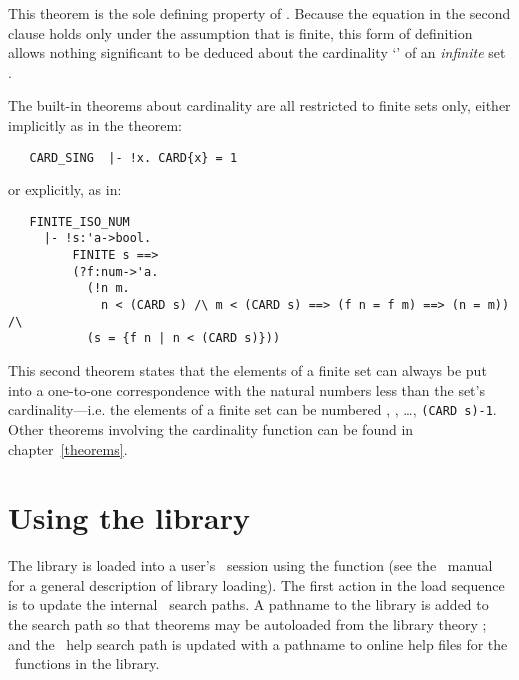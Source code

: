 \noindent This theorem is the sole defining property of .  Because the
equation in the second clause holds only under the assumption that  is
finite, this form of definition allows nothing significant to be deduced about
the cardinality `' of an {\it infinite\/} set .

The built-in theorems about cardinality are all restricted to finite sets only,
either implicitly as in the theorem:

\begin{hol}
\begin{verbatim}
   CARD_SING  |- !x. CARD{x} = 1
\end{verbatim}\end{hol}

\noindent or explicitly, as in:

\begin{hol}
\begin{verbatim}
   FINITE_ISO_NUM
     |- !s:'a->bool.
         FINITE s ==>
         (?f:num->'a.
           (!n m.
             n < (CARD s) /\ m < (CARD s) ==> (f n = f m) ==> (n = m)) /\
           (s = {f n | n < (CARD s)}))
\end{verbatim}\end{hol}

\noindent This second theorem states that the elements of a finite set can
always be put into a one-to-one correspondence with the natural numbers less
than the set's cardinality---i.e. the elements of a finite set \ml{s} can be
numbered \ml{0}, \ml{1}, \dots, {\small\verb!(CARD s)-1!}.  Other theorems
involving the cardinality function \ml{CARD} can be found in
chapter~\ref{theorems}.

\section{Using the library}\label{using}

The  library is loaded into a user's \HOL\ session using the
function \ml{load\_library} (see the \HOL\ manual for a general description of
library loading).  The first action in the load sequence is to update the
internal \HOL\ search paths.  A pathname to the library is added to the search
path so that theorems may be autoloaded from the library theory
; and the \HOL\ help search path is updated with a pathname to
online help files for the \ML\ functions in the library.

